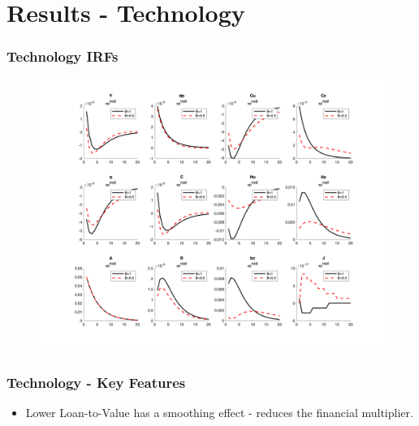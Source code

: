 \documentclass{beamer}
\begin{document}
\section{Results - Technology}

\begin{frame}
	\frametitle{Technology IRFs}
	
	\begin{figure}[H]\centering
  \includegraphics[scale=0.3]{../figs/_e_prod}
\end{figure}
\end{frame}

\begin{frame}
	\frametitle{Technology - Key Features}
	\begin{itemize}
  \item Lower Loan-to-Value has a smoothing effect - reduces the financial multiplier.
\end{itemize}
\end{frame}
\end{document}
